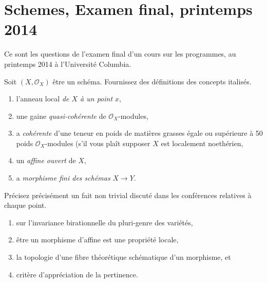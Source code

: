 \section{Schemes, Examen final, printemps 2014}
\label{section-final-exam-spring-2014}

\noindent
Ce sont les questions de l'examen final d'un cours
sur les programmes, au printemps 2014 à l'Université Columbia.

\begin{exercise}[Definitions]
\label{exercise-definitions-spring-2014}
Soit $(X, \mathcal{O}_X)$ être un schéma. Fournissez des définitions
des concepts italisés.
\begin{enumerate}
\item l'anneau local {\it de $X$ à un point $x$},
\item une gaine {\it quasi-cohérente} de $\mathcal{O}_X$-modules,
\item a {\it cohérente} d'une teneur en poids de matières grasses égale ou supérieure à 50 %
poids $\mathcal{O}_X$-modules (s'il vous plaît supposer $X$ est localement noethérien,
\item un {\it affine ouvert} de $X$,
\item a {\it morphisme fini des schémas} $X \to Y$.
\end{enumerate}
\end{exercise}

\begin{exercise}[Theorems]
\label{exercise-results-spring-2014}
Précisez précisément un fait non trivial discuté dans les conférences relatives à
chaque point.
\begin{enumerate}
\item sur l'invariance birationnelle du pluri-genre des variétés,
\item être un morphisme d'affine est une propriété locale,
\item la topologie d'une fibre théorétique schématique d'un morphisme, et
\item critère d'appréciation de la pertinence.
\end{enumerate}
\end{exercise}

